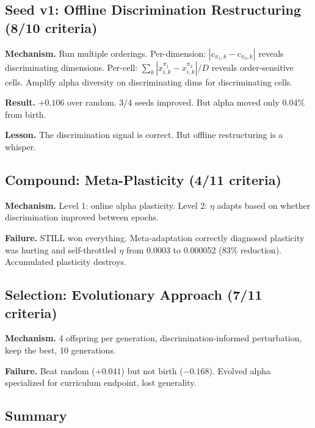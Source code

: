 \documentclass[11pt,a4paper]{article}
\begin{document}
\subsection{Seed v1: Offline Discrimination Restructuring (8/10 criteria)}

\textbf{Mechanism.} Run multiple orderings. Per-dimension: $|c_{\pi_1,k} - c_{\pi_2,k}|$ reveals discriminating dimensions. Per-cell: $\sum_k|x^{\pi_1}_{i,k} - x^{\pi_2}_{i,k}|/D$ reveals order-sensitive cells. Amplify alpha diversity on discriminating dims for discriminating cells.

\textbf{Result.} $+0.106$ over random. 3/4 seeds improved. But alpha moved only 0.04\% from birth.

\textbf{Lesson.} The discrimination signal is correct. But offline restructuring is a whisper.

\subsection{Compound: Meta-Plasticity (4/11 criteria)}

\textbf{Mechanism.} Level 1: online alpha plasticity. Level 2: $\eta$ adapts based on whether discrimination improved between epochs.

\textbf{Failure.} STILL won everything. Meta-adaptation correctly diagnosed plasticity was hurting and self-throttled $\eta$ from 0.0003 to 0.000052 (83\% reduction). Accumulated plasticity destroys.

\subsection{Selection: Evolutionary Approach (7/11 criteria)}

\textbf{Mechanism.} 4 offspring per generation, discrimination-informed perturbation, keep the best, 10 generations.

\textbf{Failure.} Beat random ($+0.041$) but not birth ($-0.168$). Evolved alpha specialized for curriculum endpoint, lost generality.

\subsection{Summary}
\end{document}
